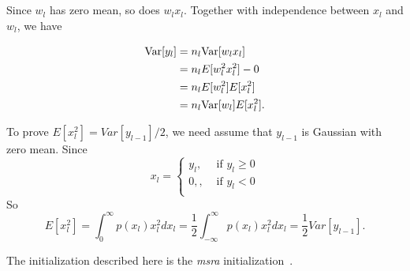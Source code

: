 \subsection{} %

Since $w_l$ has zero mean,
so does $w_l x_l$.
Together with independence between $x_l$ and $w_l$,
we have

\begin{equation}
\begin{split}
    {\mathop{\mathrm{Var}}}[y_l] &= n_l {\mathop{\mathrm{Var}}}[w_l x_l] \\
        &=n_l E[w_l^2 x_l^2] - 0 \\
        &=n_l E[w_l^2] E[x_l^2] \\
        &=n_l {\mathop{\mathrm{Var}}}[w_l] E[x_l^2].
\end{split}
\end{equation}

To prove $E[x_l^2]=Var[y_{l-1}]/2$,
we need assume that $y_{l-1}$ is Gaussian with zero mean.
Since
\begin{equation}
    x_l = \begin{cases}
        y_l, &\text{ if }y_l\ge0\\
        0, , &\text{ if }y_l<0\\
    \end{cases}
\end{equation}
So
\begin{equation}
    E[x_l^2] = \int_0^\infty p(x_l)x_l^2 dx_l
        = \frac{1}{2}\int_{-\infty}^\infty p(x_l)x_l^2 dx_l
        = \frac{1}{2}Var[y_{l-1}].
\end{equation}

The initialization described here is the \emph{msra} initialization~\cite{he2015delving}.

\subsection{} %

\subsection{} %
